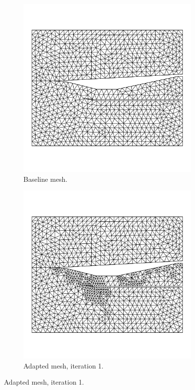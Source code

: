 \pagebreak
\begin{figure}[h!]
    \centering
    \begin{subfigure}[h]{0.39\linewidth}
        \centering
        \includegraphics[width=\linewidth]{rep/q4/mesh0.pdf}
        \caption{Baseline mesh.}
    \end{subfigure}
    \begin{subfigure}[h]{0.39\linewidth}
        \centering
        \includegraphics[width=\linewidth]{rep/q4/mesh1.pdf}
        \caption{Adapted mesh, iteration 1.}
    \end{subfigure}


\end{figure}
